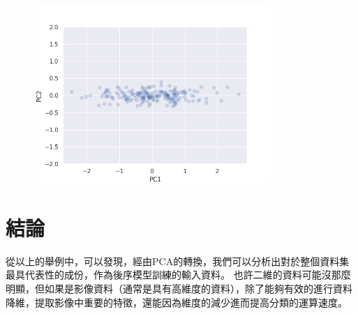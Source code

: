 \begin{itemize}
	      \begin{figure}[H]
		      \centering
		      \includegraphics[width=9cm]{pic/pca_transform.png}
		      \caption{}
		      \label{fig:pca_transform}
	      \end{figure}

\end{itemize}


\section {結論}
從以上的舉例中，可以發現，經由PCA的轉換，我們可以分析出對於整個資料集最具代表性的成份，作為後序模型訓練的輸⼊資料。
也許二維的資料可能沒那麼明顯，但如果是影像資料（通常是具有高維度的資料），除了能夠有效的進行資料降維，提取影像中重要的特徵，還能因為維度的減少進而提高分類的運算速度。

